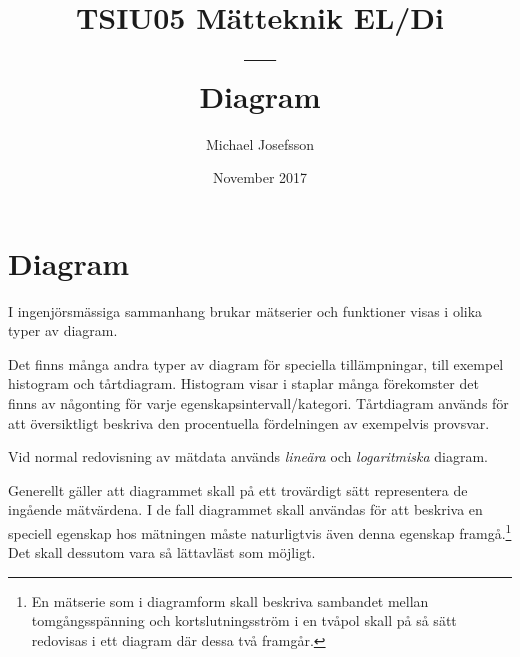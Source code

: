 \documentclass[onepage,swedish,a4paper,12pt]{scrbook}
\begin{document}
\newcommand{\tavla}[1]{\reversemarginpar{ \rule[-10mm]{0.1mm}{#1cm}}}

\newcommand{\startex}[1]{\subsubsection{Exempel}\begin{quote}#1\end{quote}}
\newcommand{\slutex}{\begin{flushright} \rule{1ex}{1ex} \end{flushright}}

\newcommand{\svarsrad}{\begin{flushright} \rule{14cm}{0.2mm} \end{flushright}}
\newcommand{\asm}[1]{\texttt{#1}}


\begin{center}
\title{TSIU05 Mätteknik EL/Di\\{} --- \\{} Diagram}
\end{center}
\date{November 2017}
\author{Michael Josefsson}
\maketitle



\addtolength{\evensidemargin}{-1.8cm}
\addtolength{\oddsidemargin}{1.8cm}
\addtolength{\textheight}{2cm}

\sloppy

\raggedbottom




\chapter*{Diagram}

I ingenjörsmässiga sammanhang brukar mätserier och funktioner visas i olika typer av diagram.

Det finns många andra typer av diagram för speciella tillämpningar, till exempel histogram och tårtdiagram. Histogram visar i staplar många förekomster det finns av någonting för varje egenskapsintervall/kategori.
Tårtdiagram används för att översiktligt beskriva den procentuella fördelningen av exempelvis provsvar.

Vid normal redovisning av mätdata används \emph{lineära}  och \emph{logaritmiska} diagram.

Generellt gäller att diagrammet skall på ett trovärdigt sätt representera de ingående mätvärdena. I de fall diagrammet skall användas för att beskriva en speciell egenskap hos mätningen måste naturligtvis även denna egenskap framgå.\footnote{En mätserie som i diagramform skall beskriva sambandet mellan tomgångsspänning och kortslutningsström i en tvåpol skall på så sätt redovisas i ett diagram där dessa två framgår.} Det skall dessutom vara så lättavläst som möjligt.
\end{document}
